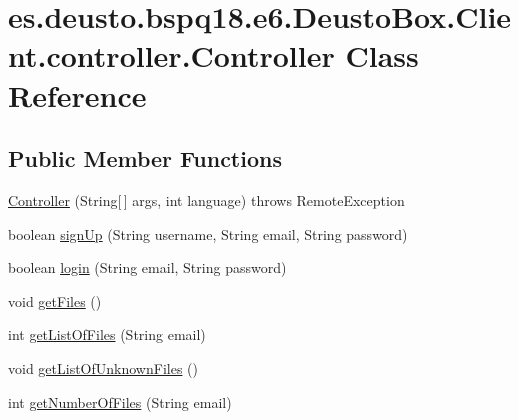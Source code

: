 \hypertarget{classes_1_1deusto_1_1bspq18_1_1e6_1_1_deusto_box_1_1_client_1_1controller_1_1_controller}{}\section{es.\+deusto.\+bspq18.\+e6.\+Deusto\+Box.\+Client.\+controller.\+Controller Class Reference}
\label{classes_1_1deusto_1_1bspq18_1_1e6_1_1_deusto_box_1_1_client_1_1controller_1_1_controller}
\subsection*{Public Member Functions}
\begin{DoxyCompactItemize}
\item 
\mbox{\hyperlink{classes_1_1deusto_1_1bspq18_1_1e6_1_1_deusto_box_1_1_client_1_1controller_1_1_controller_a814b3769e931ede74d3121711470eb60}{Controller}} (String\mbox{[}$\,$\mbox{]} args, int language)  throws Remote\+Exception 
\item 
boolean \mbox{\hyperlink{classes_1_1deusto_1_1bspq18_1_1e6_1_1_deusto_box_1_1_client_1_1controller_1_1_controller_a3cf016bbe56cf63e0268ed78aa7beb31}{sign\+Up}} (String username, String email, String password)
\item 
boolean \mbox{\hyperlink{classes_1_1deusto_1_1bspq18_1_1e6_1_1_deusto_box_1_1_client_1_1controller_1_1_controller_a2ee6b8bc2abaa3ca81032e12d9cb54fa}{login}} (String email, String password)
\item 
void \mbox{\hyperlink{classes_1_1deusto_1_1bspq18_1_1e6_1_1_deusto_box_1_1_client_1_1controller_1_1_controller_a6d1c667ff04ca4ea077464d8b9b5fcda}{get\+Files}} ()
\item 
int \mbox{\hyperlink{classes_1_1deusto_1_1bspq18_1_1e6_1_1_deusto_box_1_1_client_1_1controller_1_1_controller_a7a6c0561f5dc46c979628cf4ffa038ee}{get\+List\+Of\+Files}} (String email)
\item 
void \mbox{\hyperlink{classes_1_1deusto_1_1bspq18_1_1e6_1_1_deusto_box_1_1_client_1_1controller_1_1_controller_afe85d6590795120632d37f9c47498479}{get\+List\+Of\+Unknown\+Files}} ()
\item 
int \mbox{\hyperlink{classes_1_1deusto_1_1bspq18_1_1e6_1_1_deusto_box_1_1_client_1_1controller_1_1_controller_adfa5a297c9a23f23c03b401d872640bd}{get\+Number\+Of\+Files}} (String email)
\item 

\end{DoxyCompactItemize}
